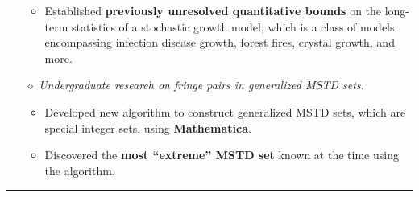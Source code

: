 \documentclass{simplecv}
\begin{document}
\begin{itemize}
  \begin{itemize}
    \item Established {\bf previously unresolved quantitative bounds} on the long-term statistics of a stochastic growth model, which is a class of models encompassing infection disease growth, forest fires, crystal growth, and more. 
  \end{itemize}
  \item[$\diamond$] {\it Undergraduate research on fringe pairs in generalized MSTD sets.} 
  \begin{itemize}
    \item Developed new algorithm to construct generalized MSTD sets, which are special integer sets, using {\bf Mathematica}. 
    \item Discovered the {\bf most ``extreme'' MSTD set} known at the time using the algorithm.
  \end{itemize}
\end{itemize}

\rule{10cm}{0.5pt}

\vspace{-0.4cm}
\end{document}
